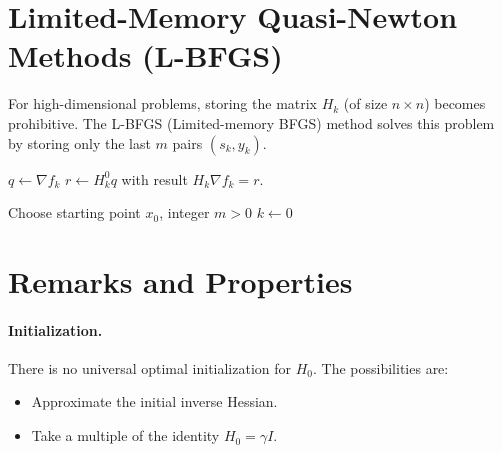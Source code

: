 \section{Limited-Memory Quasi-Newton Methods (L-BFGS)}
\label{sec:lbfgs}

For high-dimensional problems, storing the matrix $H_k$ (of size $n \times n$) becomes prohibitive.
The L-BFGS (Limited-memory BFGS) method solves this problem by storing only the last $m$ pairs $(s_k, y_k)$.

\begin{algorithm}[H]
\caption{L-BFGS two-loop recursion}
\label{alg:lbfgs-twoloop}
$q \leftarrow \nabla f_k$\;
$r \leftarrow H_k^0 q$\;
\Stop with result $H_k \nabla f_k = r$.
\end{algorithm}

\begin{algorithm}[H]
\caption{L-BFGS}
\label{alg:lbfgs}
Choose starting point $x_0$, integer $m > 0$\;
$k \leftarrow 0$\;
\end{algorithm}

\section{Remarks and Properties}

\paragraph{Initialization.} There is no universal optimal initialization for $H_0$.
The possibilities are:
\begin{itemize}
    \item Approximate the initial inverse Hessian.
    \item Take a multiple of the identity $H_0 = \gamma I$.
\end{itemize}

